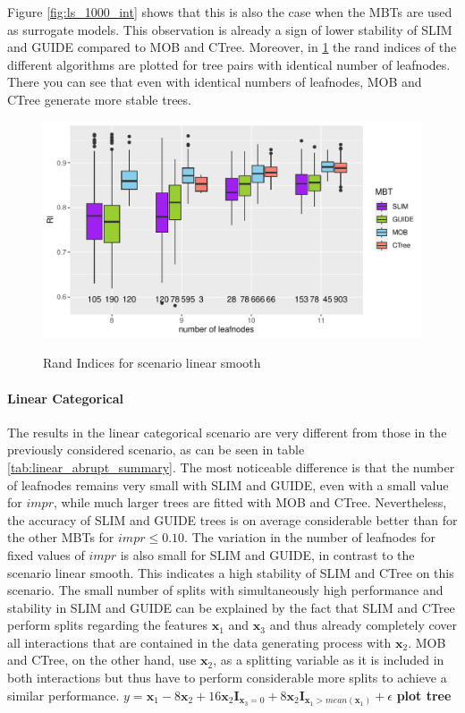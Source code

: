 Figure \ref{fig:ls_1000_int} shows that this is also the case when the MBTs are used as surrogate models. 
This observation is already a sign of lower stability of SLIM and GUIDE compared to MOB and CTree. Moreover, in \ref{fig:ls_1000_standalone_sta} the rand indices of the different algorithms are plotted for tree pairs with identical number of leafnodes. There you can see that even with identical numbers of leafnodes, MOB and CTree generate more stable trees.


\begin{figure}
\caption{Rand Indices for scenario linear smooth}
    \centering
    \includegraphics[width=16cm]{Figures/simulations/batchtools/basic_scenarios/linear_smooth/ls_1000_standalone_sta.pdf}
    \label{fig:ls_1000_standalone_sta}
\end{figure}

\paragraph{Linear Categorical} 
The results in the linear categorical scenario are very different from those in the previously considered scenario, as can be seen in table \ref{tab:linear_abrupt_summary}. The most noticeable difference is that the number of leafnodes remains very small with SLIM and GUIDE, even with a small value for $impr$, while much larger trees are fitted with MOB and CTree. Nevertheless, the accuracy of SLIM and GUIDE trees is on average considerable better than for the other MBTs for $impr \leq 0.10$.
The variation in the number of leafnodes for fixed values of $impr$ is also small for SLIM and GUIDE, in contrast to the scenario linear smooth. This indicates a high stability of SLIM and CTree on this scenario. 
The small number of splits with simultaneously high performance and stability in SLIM and GUIDE can be explained by the fact that SLIM and CTree perform splits regarding the features $\textbf{x}_1$ and $\textbf{x}_3$ and thus already completely cover all interactions that are contained in the data generating process with $\textbf{x}_2$. MOB and CTree, on the other hand, use $\textbf{x}_2$, as a splitting variable as it is included in both interactions but thus have to perform considerable more splits to achieve a similar performance.
$ y =  \textbf{x}_{1} - 8  \textbf{x}_2 + 16  \textbf{x}_2  \mathbf{I}_{\textbf{x}_3 = 0} + 8  \textbf{x}_2  \mathbf{I}_{\textbf{x}_1 > mean(\textbf{x}_1)} + \epsilon $
\textbf{plot tree}

